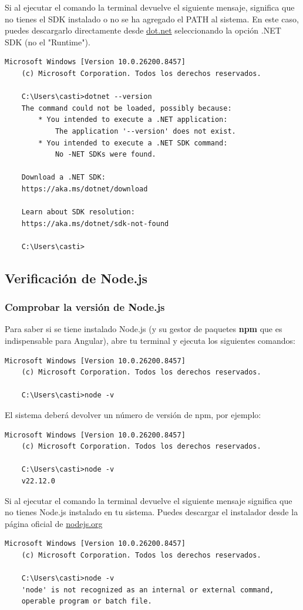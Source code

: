 \documentclass[
10pt, %
a4paper, %
oneside, %
headinclude,footinclude, %
BCOR5mm, %
]{scrartcl}
\begin{document}
Si al ejecutar el comando la terminal devuelve el siguiente mensaje, significa que no tienes el SDK instalado o no se ha agregado el PATH al sistema. En este caso, puedes descargarlo directamente desde \href{https://dotnet.microsoft.com/es-es/download/dotnet/9.0}{dot.net} seleccionando la opción .NET SDK (no el "Runtime").
\begin{lstlisting}[language=DOS]
	Microsoft Windows [Version 10.0.26200.8457]
	(c) Microsoft Corporation. Todos los derechos reservados.
	
	C:\Users\casti>dotnet --version
	The command could not be loaded, possibly because:
		* You intended to execute a .NET application:
			The application '--version' does not exist.
		* You intended to execute a .NET SDK command:
			No -NET SDKs were found.

	Download a .NET SDK:
	https://aka.ms/dotnet/download
	
	Learn about SDK resolution:
	https://aka.ms/dotnet/sdk-not-found
	
	C:\Users\casti>
\end{lstlisting}

\subsection{Verificación de Node.js}

\subsubsection{Comprobar la versión de Node.js}
Para saber si se tiene instalado Node.js (y su gestor de paquetes \textbf{npm} que es indispensable para Angular), abre tu terminal y ejecuta los siguientes comandos:

\begin{lstlisting}[language=DOS]
	Microsoft Windows [Version 10.0.26200.8457]
	(c) Microsoft Corporation. Todos los derechos reservados.
	
	C:\Users\casti>node -v
\end{lstlisting}

El sistema deberá devolver un número de versión de npm, por ejemplo:
\begin{lstlisting}[language=DOS]
	Microsoft Windows [Version 10.0.26200.8457]
	(c) Microsoft Corporation. Todos los derechos reservados.
	
	C:\Users\casti>node -v
	v22.12.0
\end{lstlisting}

Si al ejecutar el comando la terminal devuelve el siguiente mensaje significa que no tienes Node.js instalado en tu sistema. Puedes descargar el instalador desde la página oficial de \href{https://nodejs.org/en}{nodejs.org}
\begin{lstlisting}[language=DOS]
	Microsoft Windows [Version 10.0.26200.8457]
	(c) Microsoft Corporation. Todos los derechos reservados.
	
	C:\Users\casti>node -v
	'node' is not recognized as an internal or external command,
	operable program or batch file.
\end{lstlisting}
\end{document}
